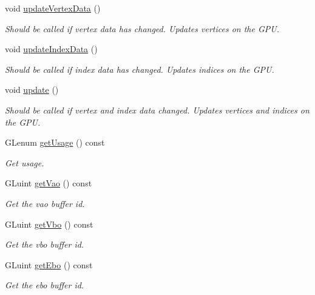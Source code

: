 \begin{DoxyCompactItemize}
void \mbox{\hyperlink{classec_1_1_geometry_data_aeb93c2e5bd5f4656eaa12651cd4927aa}{update\+Vertex\+Data}} ()
\begin{DoxyCompactList}\small\item\em Should be called if vertex data has changed. Updates vertices on the G\+PU. \end{DoxyCompactList}\item 
void \mbox{\hyperlink{classec_1_1_geometry_data_a23fd4a2619691fb7bbd5c0650544cce3}{update\+Index\+Data}} ()
\begin{DoxyCompactList}\small\item\em Should be called if index data has changed. Updates indices on the G\+PU. \end{DoxyCompactList}\item 
void \mbox{\hyperlink{classec_1_1_geometry_data_ad8edfa8a7fda52850f072ab845ef38fd}{update}} ()
\begin{DoxyCompactList}\small\item\em Should be called if vertex and index data changed. Updates vertices and indices on the G\+PU. \end{DoxyCompactList}\item 
G\+Lenum \mbox{\hyperlink{classec_1_1_geometry_data_a237459076c98af454bfc3624eebedc81}{get\+Usage}} () const
\begin{DoxyCompactList}\small\item\em Get usage. \end{DoxyCompactList}\item 
G\+Luint \mbox{\hyperlink{classec_1_1_geometry_data_abc8d74fcacf693aad19683387adcfadf}{get\+Vao}} () const
\begin{DoxyCompactList}\small\item\em Get the vao buffer id. \end{DoxyCompactList}\item 
G\+Luint \mbox{\hyperlink{classec_1_1_geometry_data_a067f9cd54e35a1faff1c5011a542eed8}{get\+Vbo}} () const
\begin{DoxyCompactList}\small\item\em Get the vbo buffer id. \end{DoxyCompactList}\item 
G\+Luint \mbox{\hyperlink{classec_1_1_geometry_data_ae3f427f933c595b169bd10551d52abc3}{get\+Ebo}} () const
\begin{DoxyCompactList}\small\item\em Get the ebo buffer id. \end{DoxyCompactList}\end{DoxyCompactItemize}
